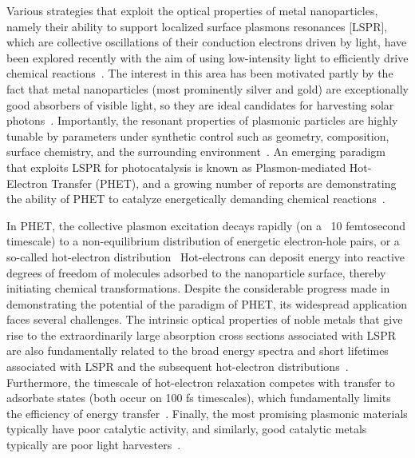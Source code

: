 \documentclass[journal=jpclcd,manuscript=letter]{achemso}
\begin{document}
Various strategies that exploit the optical properties of metal nanoparticles, namely their ability to support localized surface plasmons resonances [LSPR], 
which are collective oscillations of their 
conduction electrons driven by light, have been explored recently with the aim of using low-intensity light to efficiently drive chemical 
reactions~\cite{LCI_NatureMater_2011,KAC_ACSCatalysis_2013,ZLQ_RSCAdvances_2015,PKL_AccChemRes_2015}.  The interest in this area has 
been motivated partly by the fact that metal nanoparticles (most prominently silver and gold) are exceptionally good absorbers of visible light, 
so they are ideal candidates for harvesting solar photons~\cite{AP_NatMat_2010}.  
Importantly, the resonant properties of plasmonic particles are highly tunable by parameters under synthetic control such as geometry, composition, surface chemistry, and the surrounding 
environment~\cite{SX_Science_2002,BCN_ChemRev_2005,GB_NatPhoton_2010}.  An emerging paradigm that exploits LSPR for photocatalysis is known as Plasmon-mediated Hot-Electron Transfer (PHET),
and a growing number of reports are demonstrating the ability of PHET to catalyze energetically demanding chemical 
reactions~\cite{CXL_NatureChem_2011,MZL_Science_2013,MLL_NanoLett_2013,LFP_AC_2015,ZHX_NatPhoton_2016,ZJM_ACSNano_2016,SZZ_PNAS_2016,SCR_JPCC_2016}.

In PHET, the collective plasmon excitation decays rapidly (on a ~10 femtosecond timescale) to a non-equilibrium distribution of energetic electron-hole pairs, or a so-called hot-electron 
distribution~\cite{KAC_ACSCatalysis_2013,GZG_JPCC_2013,SNJ_NatComm_2014,WCM_Science_2015,MWW_NatComm_2015, BSN_ACSNano_2016}  
Hot-electrons can deposit energy into reactive degrees of freedom of molecules adsorbed to the nanoparticle surface, thereby initiating chemical transformations.  Despite the considerable progress made in 
demonstrating the potential of the paradigm of PHET, its widespread application faces several challenges. The intrinsic optical properties of noble metals that give rise to the extraordinarily 
large absorption cross sections associated with LSPR are also fundamentally related to the broad energy spectra and short lifetimes associated with LSPR and the subsequent hot-electron 
distributions~\cite{KS_JCP_1983}. 
Furthermore, the timescale of hot-electron relaxation competes 
with transfer to adsorbate states (both occur on 100 fs timescales), which fundamentally limits the efficiency of energy transfer~\cite{WCM_Science_2015}.  Finally, the most promising plasmonic materials typically have poor catalytic activity, and similarly,
good catalytic metals typically are poor light harvesters~\cite{SZZ_PNAS_2016}.
\end{document}
